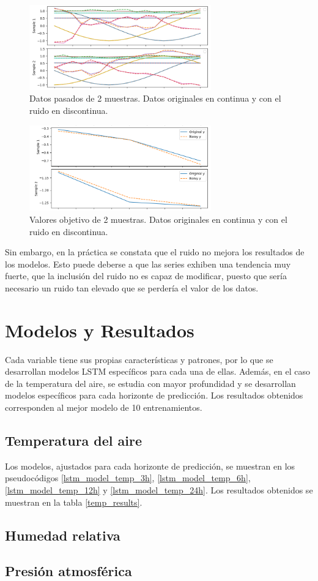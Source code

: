 \begin{figure}[H]
    \centering
    \includegraphics[width=0.7\textwidth]{images/noise_past_data.png}
    \caption{Datos pasados de 2 muestras. Datos originales en continua y con el ruido en discontinua.}
    \label{noise1}
\end{figure}

\begin{figure}[H]
    \centering
    \includegraphics[width=0.7\textwidth]{images/noise_y.png}
    \caption{Valores objetivo de 2 muestras. Datos originales en continua y con el ruido en discontinua.}
    \label{noise2}
\end{figure}

Sin embargo, en la práctica se constata que el ruido no mejora los resultados de los modelos. Esto puede deberse a que las series exhiben una tendencia muy fuerte, 
que la inclusión del ruido no es capaz de modificar, puesto que sería necesario un ruido tan elevado que se perdería el valor de los datos.

\section{Modelos y Resultados}
\label{sec:resultados}
Cada variable tiene sus propias características y patrones, por lo que se desarrollan modelos LSTM específicos para cada una de ellas. 
Además, en el caso de la temperatura del aire, se estudia con mayor profundidad y se desarrollan modelos específicos para cada horizonte de predicción.
Los resultados obtenidos corresponden al mejor modelo de 10 entrenamientos.
\subsection{Temperatura del aire}
Los modelos, ajustados para cada horizonte de predicción, se muestran en los pseudocódigos \ref{lstm_model_temp_3h}, \ref{lstm_model_temp_6h}, \ref{lstm_model_temp_12h} y \ref{lstm_model_temp_24h}.
Los resultados obtenidos se muestran en la tabla \ref{temp_results}.



\subsection{Humedad relativa}
\subsection{Presión atmosférica}

